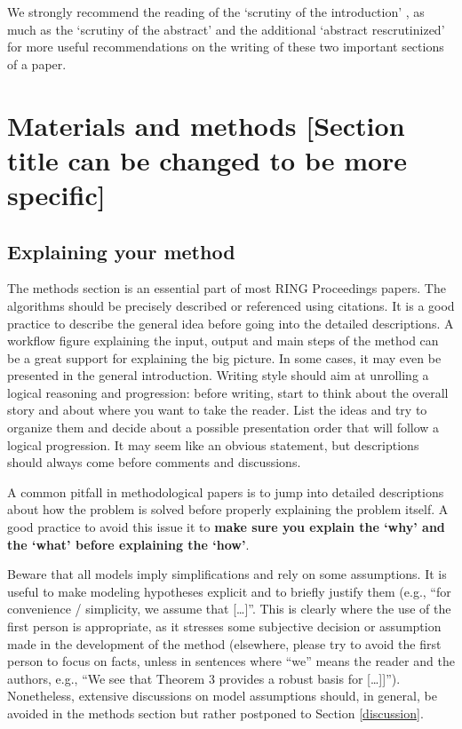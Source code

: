 \documentclass[preprint]{ring}
\begin{document}
We strongly recommend the reading of the `scrutiny of the introduction' \citep{Claerbout1988S}, as much as the `scrutiny of the abstract' \citep{Landes1966BAAPG} and the additional `abstract rescrutinized' \citep{Lowman1998G} for more useful recommendations on the writing of these two important sections of a paper.

\section{Materials and methods [Section title can be changed to be more specific]}
\label{Method}

\subsection{Explaining your method}

The methods section is an essential part of most RING Proceedings papers. The algorithms should be precisely described or referenced using citations. It is a good practice to describe the general idea before going into the detailed descriptions. A workflow figure explaining the input, output and main steps of the method can be a great support for explaining the big picture. In some cases, it may even be presented in the general introduction. Writing style should aim at unrolling a logical reasoning and progression: before writing, start to think about the overall story and about where you want to take the reader. List the ideas and try to organize them and decide about a possible presentation order that will follow a logical progression. It may seem like an obvious statement, but descriptions should always come before comments and discussions. 

A common pitfall in methodological papers is to jump into detailed descriptions about how the problem is solved before properly explaining the problem itself. A good practice to avoid this issue it to \textbf{make sure you explain the ‘why’ and the ‘what’ before explaining the ‘how’}.

Beware that all models imply simplifications and rely on some assumptions. It is useful to make modeling hypotheses explicit and to briefly justify them (e.g., ``for convenience / simplicity, we assume that […]''. This is clearly where the use of the first person is appropriate, as it stresses some subjective decision or assumption made in the development of the method (elsewhere, please try to avoid the first person to focus on facts, unless in sentences where ``we'' means the reader and the authors, e.g., ``We see that Theorem 3 provides a robust basis for [\ldots]]''). Nonetheless, extensive discussions on model assumptions should, in general, be avoided in the methods section but rather postponed to Section \ref{discussion}.
\end{document}
